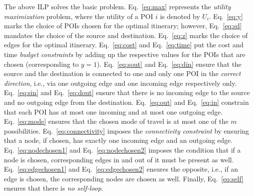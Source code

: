 
The above ILP solves the basic \trip problem.  Eq.~\eqref{eq:max}
represents the \emph{utility maximization} problem, where the
utility of a POI $i$ is denoted by $U_i$.  Eq.~\eqref{eq:y} marks
the choice of POIs chosen for the optimal itinerary; however,
Eq.~\eqref{eq:sd} mandates the choice of the source and destination.
Eq.~\eqref{eq:z} marks the choice of edges for the optimal
itinerary.  Eq.~\eqref{eq:cost} and Eq.~\eqref{eq:time} put the
cost and time \emph{budget constraints} by adding up the
respective values for the POIs that are chosen (corresponding to
$y = 1$).  Eq.~\eqref{eq:sout} and Eq.~\eqref{eq:din} ensure that
the source and the destination is connected to one and only one
POI in the \emph{correct direction}, i.e., via one outgoing edge
and one incoming edge respectively only.  Eq.~\eqref{eq:sin} and
Eq.~\eqref{eq:dout} ensure that there is no incoming edge to the
source and no outgoing edge from the destination.
Eq.~\eqref{eq:out} and Eq.~\eqref{eq:in} constrain that each POI
has at most one incoming and at most one outgoing edge.
Eq.~\eqref{eq:mode} ensures that the chosen mode of travel is at
most one of the $m$ possibilities.  Eq.~\eqref{eq:connectivity}
imposes the \emph{connectivity constraint} by ensuring that a
node, if chosen, has exactly one incoming edge and an outgoing
edge.  Eq.~\eqref{eq:nodechosen1} and Eq.~\eqref{eq:nodechosen2}
imposes the condition that if a node is chosen, corresponding
edges in and out of it must be present as well.
Eq.~\eqref{eq:edgechosen1} and Eq.~\eqref{eq:edgechosen2} ensures
the opposite, i.e., if an edge is chosen, the corresponding nodes
are chosen as well.  Finally, Eq.~\eqref{eq:self} ensures that
there is \emph{no self-loop}.


